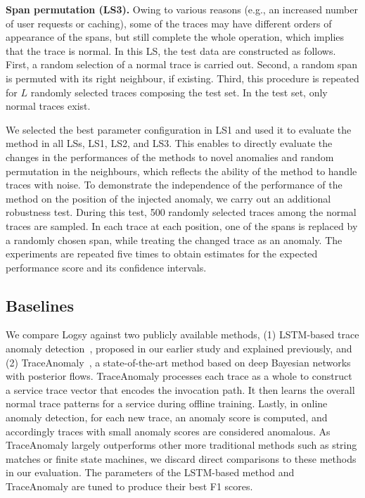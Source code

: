 \textbf{Span permutation (LS3).} Owing to various reasons (e.g., an increased number of user requests or caching), some of the traces may have different orders of appearance of the spans, but still complete the whole operation, which implies that the trace is normal. In this LS, the test data are constructed as follows. First, a random selection of a normal trace is carried out. Second, a random span is permuted with its right neighbour, if existing. Third, this procedure is repeated for $L$ randomly selected traces composing the test set. In the test set, only normal traces exist.

We selected the best parameter configuration in LS1 and used it to evaluate the method in all LSs, LS1, LS2, and LS3. This enables to directly evaluate the changes in the performances of the methods to novel anomalies and random permutation in the neighbours, which reflects the ability of the method to handle traces with noise. To demonstrate the independence of the performance of the method on the position of the injected anomaly, we carry out an additional robustness test. During this test, 500 randomly selected traces among the normal traces are sampled. In each trace at each position, one of the spans is replaced by a randomly chosen span, while treating the changed trace as an anomaly. The experiments are repeated five times to obtain estimates for the expected performance score and its confidence intervals. 

\subsection{Baselines}
We compare Logsy against two publicly available methods, (1) LSTM-based trace anomaly detection~\cite{nedelkoski2019anomalymultimodal}, proposed in our earlier study and explained previously, and (2) TraceAnomaly~\cite{liu2020unsupervised}, a state-of-the-art method based on deep Bayesian networks with posterior flows. TraceAnomaly processes each trace as a whole to construct a service trace vector that encodes the invocation path. It then learns the overall normal trace patterns for a service during offline training. Lastly, in online anomaly detection, for each new trace, an anomaly score is computed, and accordingly traces with small anomaly scores are considered anomalous. As TraceAnomaly largely outperforms other more traditional methods such as string matches or finite state machines, we discard direct comparisons to these methods in our evaluation. The parameters of the LSTM-based method and TraceAnomaly are tuned to produce their best F1 scores.

